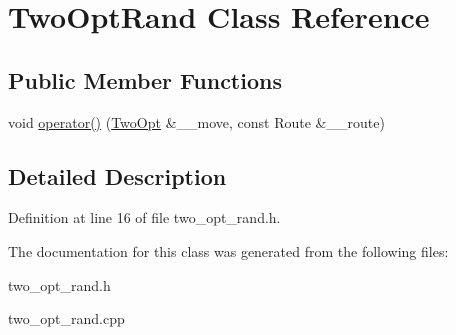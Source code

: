 \hypertarget{classTwoOptRand}{
\section{Two\-Opt\-Rand Class Reference}
\label{classTwoOptRand}
}
\subsection*{Public Member Functions}
\begin{CompactItemize}
\item 
\hypertarget{classTwoOptRand_e2f362f359517c027f6f22fba0aab375}{
void \hyperlink{classTwoOptRand_e2f362f359517c027f6f22fba0aab375}{operator()} (\hyperlink{classTwoOpt}{Two\-Opt} \&\_\-\_\-move, const Route \&\_\-\_\-route)}
\label{classTwoOptRand_e2f362f359517c027f6f22fba0aab375}

\end{CompactItemize}


\subsection{Detailed Description}




Definition at line 16 of file two\_\-opt\_\-rand.h.

The documentation for this class was generated from the following files:\begin{CompactItemize}
\item 
two\_\-opt\_\-rand.h\item 
two\_\-opt\_\-rand.cpp\end{CompactItemize}

